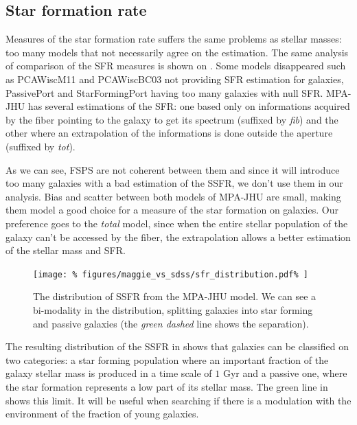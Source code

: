 \subsection{Star formation rate}
\label{sub:star_formation_rate}

Measures of the star formation rate suffers the same problems as stellar
masses: too many models that not necessarily agree on the estimation. The
same analysis of comparison of the SFR measures is shown on
. Some models disappeared such as PCAWiscM11
and PCAWiscBC03 not providing SFR estimation for galaxies, PassivePort and
StarFormingPort having too many galaxies with null SFR\@. MPA-JHU has
several estimations of the SFR\@: one based only on informations acquired by
the fiber pointing to the galaxy to get its spectrum (suffixed by
\emph{fib}) and the other where an extrapolation of the informations is done
outside the aperture (suffixed by \emph{tot}).

As we can see, FSPS are not coherent between them and since it will
introduce too many galaxies with a bad estimation of the SSFR, we don't use
them in our analysis. Bias and scatter between both models of MPA-JHU are
small, making them model a good choice for a measure of the star formation
on galaxies. Our preference goes to the \emph{total} model, since when the
entire stellar population of the galaxy can't be accessed by the fiber, the
extrapolation allows a better estimation of the stellar mass and SFR\@.

\begin{figure}[htb]
    \centering
    \texttt{[image: \%
        figures/maggie\_vs\_sdss/sfr\_distribution.pdf\%
    ]}
    \caption{The distribution of SSFR from the MPA-JHU model. We can see a
    bi-modality in the distribution, splitting galaxies into star forming
and passive galaxies (the \emph{green dashed} line shows the
separation).\label{fig:ssfr_distribution}}
\end{figure}

The resulting distribution of the SSFR in 
shows that galaxies can be classified on two categories: a star forming
population where an important fraction of the galaxy stellar mass is
produced in a time scale of $1$ Gyr and a passive one, where the star
formation represents a low part of its stellar mass. The green line in
 shows this limit. It will be useful when
searching if there is a modulation with the environment of the fraction of
young galaxies.


